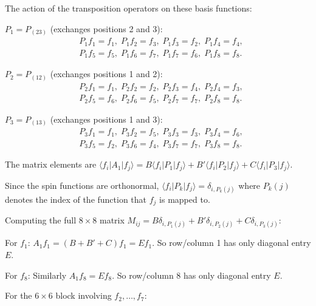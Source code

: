 \documentclass[12pt]{article}
\begin{document}
The action of the transposition operators on these basis functions:

\textbf{$P_1 = P_{(23)}$} (exchanges positions 2 and 3):
\begin{align*}
&P_1 f_1 = f_1, \; P_1 f_2 = f_3, \; P_1 f_3 = f_2, \; P_1 f_4 = f_4, \\
&P_1 f_5 = f_5, \; P_1 f_6 = f_7, \; P_1 f_7 = f_6, \; P_1 f_8 = f_8.
\end{align*}

\textbf{$P_2 = P_{(12)}$} (exchanges positions 1 and 2):
\begin{align*}
&P_2 f_1 = f_1, \; P_2 f_2 = f_2, \; P_2 f_3 = f_4, \; P_2 f_4 = f_3, \\
&P_2 f_5 = f_6, \; P_2 f_6 = f_5, \; P_2 f_7 = f_7, \; P_2 f_8 = f_8.
\end{align*}

\textbf{$P_3 = P_{(13)}$} (exchanges positions 1 and 3):
\begin{align*}
&P_3 f_1 = f_1, \; P_3 f_2 = f_5, \; P_3 f_3 = f_3, \; P_3 f_4 = f_6, \\
&P_3 f_5 = f_2, \; P_3 f_6 = f_4, \; P_3 f_7 = f_7, \; P_3 f_8 = f_8.
\end{align*}

The matrix elements are $\langle f_i | A_1 | f_j \rangle = B\langle f_i|P_1|f_j\rangle + B'\langle f_i|P_2|f_j\rangle + C\langle f_i|P_3|f_j\rangle$.

Since the spin functions are orthonormal, $\langle f_i|P_k|f_j\rangle = \delta_{i, P_k(j)}$ where $P_k(j)$ denotes the index of the function that $f_j$ is mapped to.

Computing the full $8\times 8$ matrix $M_{ij} = B\delta_{i,P_1(j)} + B'\delta_{i,P_2(j)} + C\delta_{i,P_3(j)}$:

For $f_1$: $A_1 f_1 = (B + B' + C)f_1 = Ef_1$. So row/column 1 has only diagonal entry $E$.

For $f_8$: Similarly $A_1 f_8 = Ef_8$. So row/column 8 has only diagonal entry $E$.

For the $6\times 6$ block involving $f_2, \ldots, f_7$:
\end{document}
